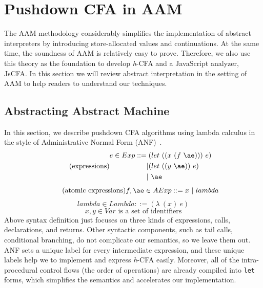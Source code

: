 \documentclass[12pt]{report}
\begin{document}
\chapter{Pushdown CFA in AAM}
\label{sec:PushdownAAM}
The AAM methodology considerably simplifies the implementation of abstract interpreters by introducing store-allocated values
and continuations. At the same time, the soundness of AAM is relatively easy to prove.
Therefore, we also use this theory as the foundation to develop \textit{h}-CFA and a JavaScript analyzer, JsCFA\@.
In this section we will review abstract interpretation in the setting of AAM to help readers to understand our techniques.

\section{Abstracting Abstract Machine}
\label{subs:Abstracting Abstract Machine}
In this section, we describe pushdown CFA algorithms using
lambda calculus in the style of Administrative Normal Form (ANF)~\cite{flanagan1993essence}.
\[
\tag{expressions}
\begin{aligned}
\label{eq:bnf}
e \in Exp ::= {}& (let\ ((x\ (f\ \ae)))\ e) {} \\
| & (let\ ((y\ \ae))\ e) {}\\
| & \ \ae
\end{aligned}
\]
\[
\tag{atomic expressions}
f, \ae \in AExp ::= x\ |\ lambda
\]
\[
\tag{lambda abstractions}
lambda \in Lambda ::= (\lambda\ (x)\ e)
\]
\[
\tag{variables}
x,y \in Var \mbox{ is a set of identifiers}
\]
Above syntax definition just focuses on three kinds of expressions, calls, declarations, and returns.
Other syntactic components, such as tail calls, conditional branching, do not complicate our semantics, so we leave them out.
ANF sets a unique label for every intermediate expression, and these unique labels help we to implement and express \textit{h}-CFA easily.
Moreover, all of the intra-procedural control flows (the order of operations) are already compiled into \verb|let| forms, which simplifies the semantics and accelerates our implementation.
\end{document}
